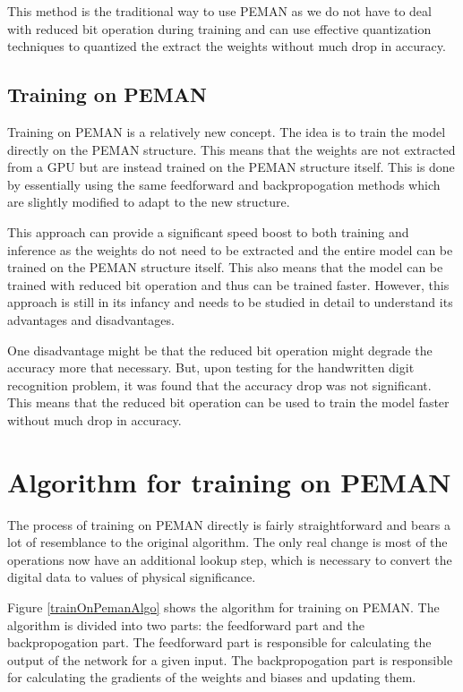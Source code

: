 This method is the traditional way to use PEMAN as we do not have to deal with reduced bit operation during training and can use effective quantization techniques to quantized the extract the weights without much drop in accuracy.

\subsection{Training on PEMAN}

Training on PEMAN is a relatively new concept. The idea is to train the model directly on the PEMAN structure. This means that the weights are not extracted from a GPU but are instead trained on the PEMAN structure itself. This is done by essentially using the same feedforward and backpropogation methods which are slightly modified to adapt to the new structure.

This approach can provide a significant speed boost to both training and inference as the weights do not need to be extracted and the entire model can be trained on the PEMAN structure itself. This also means that the model can be trained with reduced bit operation and thus can be trained faster. However, this approach is still in its infancy and needs to be studied in detail to understand its advantages and disadvantages.

One disadvantage might be that the reduced bit operation might degrade the accuracy more that necessary. But, upon testing for the handwritten digit recognition problem, it was found that the accuracy drop was not significant. This means that the reduced bit operation can be used to train the model faster without much drop in accuracy.

\section{Algorithm for training on PEMAN}

The process of training on PEMAN directly is fairly straightforward and bears a lot of resemblance to the original algorithm. The only real change is most of the operations now have an additional lookup step, which is necessary to convert the digital data to values of physical significance.

Figure \ref{trainOnPemanAlgo} shows the algorithm for training on PEMAN. The algorithm is divided into two parts: the feedforward part and the backpropogation part. The feedforward part is responsible for calculating the output of the network for a given input. The backpropogation part is responsible for calculating the gradients of the weights and biases and updating them.

